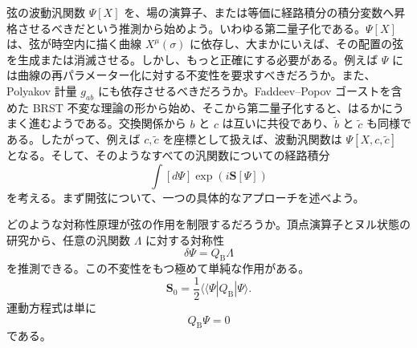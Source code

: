弦の波動汎関数 $\Psi[X]$ を、場の演算子、または等価に経路積分の積分変数へ昇格させるべきだという推測から始めよう。いわゆる第二量子化である。$\Psi[X]$ は、弦が時空内に描く曲線 $X^\mu(\sigma)$ に依存し、大まかにいえば、その配置の弦を生成または消滅させる。しかし、もっと正確にする必要がある。例えば $\Psi$ には曲線の再パラメーター化に対する不変性を要求すべきだろうか。また、Polyakov 計量 $g_{ab}$ にも依存させるべきだろうか。Faddeev--Popov ゴーストを含めた BRST 不変な理論の形から始め、そこから第二量子化すると、はるかにうまく進むようである。交換関係から $b$ と $c$ は互いに共役であり、$\widetilde b$ と $\widetilde c$ も同様である。したがって、例えば $c,\widetilde c$ を座標として扱えば、波動汎関数は $\Psi[X,c,\widetilde c]$ となる。そして、そのようなすべての汎関数についての経路積分
\begin{equation}
\int[d\Psi]\exp(i\boldsymbol S[\Psi])
\tag{9.6.1}\label{eq:9.6.1}
\end{equation}
を考える。まず開弦について、一つの具体的なアプローチを述べよう。

どのような対称性原理が弦の作用を制限するだろうか。頂点演算子とヌル状態の研究から、任意の汎関数 $\Lambda$ に対する対称性
\begin{equation}
\delta\Psi=Q_{\mathrm B}\Lambda
\tag{9.6.2}\label{eq:9.6.2}
\end{equation}
を推測できる。この不変性をもつ極めて単純な作用がある。
\begin{equation}
\boldsymbol S_0=\frac12\langle\!\langle\Psi|Q_{\mathrm B}|\Psi\rangle.
\tag{9.6.3}\label{eq:9.6.3}
\end{equation}
運動方程式は単に
\begin{equation}
Q_{\mathrm B}\Psi=0
\tag{9.6.4}\label{eq:9.6.4}
\end{equation}
である。

